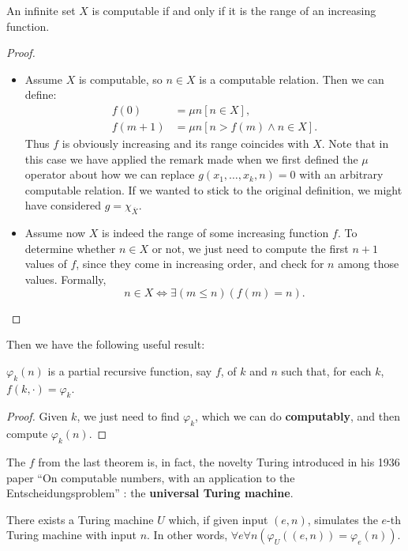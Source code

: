 \documentclass[../main.tex]{memoir}
\begin{document}
\begin{lemma}
  An infinite set $X$ is computable if and only if it is the range of an increasing function.
\end{lemma}
\begin{proof}
  \begin{itemize}
  \item Assume $X$ is computable, so $n \in X$ is a computable relation. Then we can define:
    \begin{align*}
      f(0) & = \mu n [n \in X], \\
      f(m + 1) & = \mu n [n > f(m) \land n \in X].
    \end{align*}
    Thus $f$ is obviously increasing and its range coincides with $X$. Note that in this case we have applied the remark made when we first defined the $\mu$ operator about how we can replace $g(x_1, \ldots, x_k, n) = 0$ with an arbitrary computable relation. If we wanted to stick to the original definition, we might have considered $g = \chi_{\overline{X}}$.
  \item Assume now $X$ is indeed the range of some increasing function $f$. To determine whether $n \in X$ or not, we just need to compute the first $n + 1$ values of $f$, since they come in increasing order, and check for $n$ among those values. Formally,
    \[ n \in X \iff \exists (m \le n) (f(m) = n). \]
  \end{itemize}
\end{proof}


Then we have the following useful result:

\begin{theorem}
  $\varphi_k(n)$ is a partial recursive function, say $f$, of $k$ and $n$ such that, for each $k$, $f(k, \cdot) = \varphi_k$.
\end{theorem}
\begin{proof}
  Given $k$, we just need to find $\varphi_k$, which we can do \textbf{computably}, and then compute $\varphi_k(n)$.
\end{proof}

The $f$ from the last theorem is, in fact, the novelty Turing introduced in his 1936 paper ``On computable numbers, with an application to the Entscheidungsproblem'' \cite{oncomputablenumbers}: the \textbf{universal Turing machine}.

\begin{theorem}
  There exists a Turing machine $U$ which, if given input $(e, n)$, simulates the $e$-th Turing machine with input $n$. In other words, $\forall e \forall n (\varphi_U((e, n)) = \varphi_e(n))$.
\end{theorem}
\end{document}
